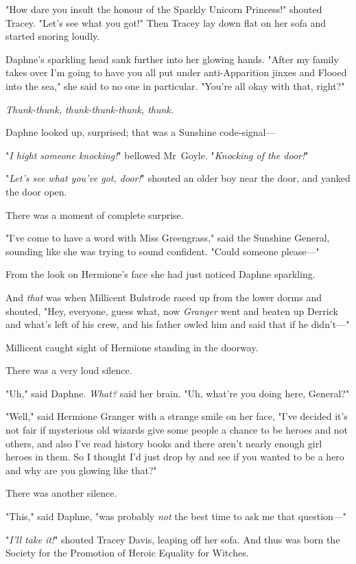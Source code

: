 "How dare you insult the honour of the Sparkly Unicorn Princess!" shouted
Tracey. "Let's see what you got!" Then Tracey lay down flat on her sofa and
started snoring loudly.

Daphne's sparkling head sank further into her glowing hands. "After my family
takes over I'm going to have you all put under anti-Apparition jinxes and
Flooed into the sea," she said to no one in particular. "You're all okay with
that, right?"

\emph{Thunk-thunk, thunk-thunk-thunk, thunk.}

Daphne looked up, surprised; that was a Sunshine code-signal---

"\emph{I hight someone knocking!}" bellowed Mr~Goyle. "\emph{Knocking of the
door!}"

"\emph{Let's see what you've got, door!}" shouted an older boy near the door,
and yanked the door open.

There was a moment of complete surprise.

"I've come to have a word with Miss Greengrass," said the Sunshine General,
sounding like she was trying to sound confident. "Could someone please---"

From the look on Hermione's face she had just noticed Daphne sparkling.

And \emph{that} was when Millicent Bulstrode raced up from the lower dorms and
shouted, "Hey, everyone, guess what, now \emph{Granger} went and beaten up
Derrick and what's left of his crew, and his father owled him and said that if
he didn't---"

Millicent caught sight of Hermione standing in the doorway.

There was a very loud silence.

"Uh," said Daphne. \emph{What?} said her brain. "Uh, what're you doing here,
General?"

"Well," said Hermione Granger with a strange smile on her face, "I've decided
it's not fair if mysterious old wizards give some people a chance to be heroes
and not others, and also I've read history books and there aren't nearly enough
girl heroes in them. So I thought I'd just drop by and see if you wanted to be
a hero and why are you glowing like that?"

There was another silence.

"This," said Daphne, "was probably \emph{not} the best time to ask me that
question---"

"\emph{I'll take it!}" shouted Tracey Davis, leaping off her sofa.
\later
And thus was born the Society for the Promotion of Heroic Equality for Witches.
